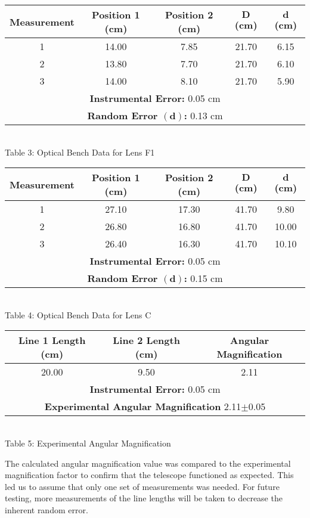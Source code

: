\begin{center}
    \begin{tabular}{|c|c|c|c|c|}
        \hline
    \textbf{Measurement} & \textbf{Position 1 (cm)} & \textbf{Position 2 (cm)} & $\bm{D}$\textbf{ (cm)} & $\bm{d}$\textbf{ (cm)} \\ \hline
        1 & 14.00 & 7.85 & 21.70 & 6.15\\ 
        2 & 13.80 & 7.70 & 21.70 & 6.10\\ 
        3 & 14.00 & 8.10 & 21.70 & 5.90\\  \hline
        \multicolumn{5}{|c|}{\textbf{Instrumental Error:} 0.05 cm} \\
        \multicolumn{5}{|c|}{\textbf{Random Error $\bm{(d)}$:} 0.13 cm} \\
        \hline
    \end{tabular}
    \vspace{3mm}
    \\Table 3: Optical Bench Data for Lens F1\\
    \vspace{5mm}
\newpage
    \begin{tabular}{|c|c|c|c|c|}
        \hline
        \textbf{Measurement} & \textbf{Position 1 (cm)} & \textbf{Position 2 (cm)} & $\bm{D}$\textbf{ (cm)} & $\bm{d}$\textbf{ (cm)} \\ \hline
        1 & 27.10 & 17.30 & 41.70 & 9.80\\ 
        2 & 26.80 & 16.80 & 41.70 & 10.00\\ 
        3 & 26.40 & 16.30 & 41.70 & 10.10\\  \hline
        \multicolumn{5}{|c|}{\textbf{Instrumental Error:} 0.05 cm} \\
        \multicolumn{5}{|c|}{\textbf{Random Error $\bm{(d)}$:} 0.15 cm} \\
        \hline
    \end{tabular}
    \vspace{3mm}
    \\Table 4: Optical Bench Data for Lens C\\
    \vspace{10mm}
    \begin{tabular}{|c|c|c|}
        \hline
        \textbf{Line 1 Length (cm)} & \textbf{Line 2 Length (cm)} & \textbf{Angular Magnification} \\ \hline
        20.00 & 9.50 & 2.11 \\ \hline
        \multicolumn{3}{|c|}{\textbf{Instrumental Error:} 0.05 cm} \\ 
        \multicolumn{3}{|c|}{\textbf{Experimental Angular Magnification} 2.11$\pm$0.05} \\ \hline
    \end{tabular}
    \vspace{3mm}
    \\Table 5: Experimental Angular Magnification\\
\end{center}
The calculated angular magnification value was compared to the experimental magnification factor to confirm that the telescope functioned as expected.
This led us to assume that only one set of measurements was needed. For future testing, more measurements of the line lengths will be taken to decrease the inherent random error.